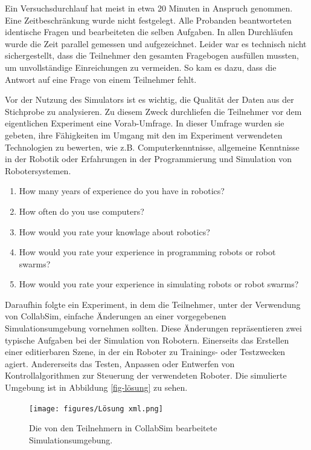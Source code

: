 \documentclass[german,version-2020-11]{uzl-thesis}
\begin{document}
  Ein Versuchsdurchlauf hat meist in etwa 20 Minuten in Anspruch genommen. Eine Zeitbeschränkung wurde nicht festgelegt. 
  Alle Probanden beantworteten identische Fragen und bearbeiteten die selben Aufgaben.
  In allen Durchläufen wurde die Zeit parallel gemessen und aufgezeichnet. Leider war es technisch nicht sichergestellt, 
  dass die Teilnehmer den gesamten Fragebogen ausfüllen mussten, um unvollständige Einreichungen zu vermeiden. 
  So kam es dazu, dass die Antwort auf eine Frage von einem Teilnehmer fehlt.
        
  Vor der Nutzung des Simulators ist es wichtig, die Qualität der Daten aus der Stichprobe zu analysieren. 
  Zu diesem Zweck durchliefen die Teilnehmer vor dem eigentlichen Experiment eine Vorab-Umfrage. 
  In dieser Umfrage wurden sie gebeten, ihre Fähigkeiten im Umgang mit den im Experiment verwendeten Technologien zu bewerten, 
  wie z.B. Computerkenntnisse, allgemeine Kenntnisse in der Robotik oder Erfahrungen in der Programmierung und Simulation von Robotersystemen.

  \begin{enumerate}
    \item 
    How many years of experience do you have in robotics?
    \item
    How often do you use computers? 
    \item
    How would you rate your knowlage about robotics? %
    \item
    How would you rate your experience in programming robots or robot swarms? %
    \item
    How would you rate your experience in simulating robots or robot swarms? %
    \end{enumerate}        
        
  Daraufhin folgte ein Experiment, in dem die Teilnehmer, unter der Verwendung von CollabSim, einfache Änderungen an einer vorgegebenen Simulationsumgebung vornehmen sollten.
  Diese Änderungen repräsentieren zwei typische Aufgaben bei der Simulation von Robotern. 
  Einerseits das Erstellen einer editierbaren Szene, in der ein Roboter zu Trainings- oder Testzwecken agiert.
  Andererseits das Testen, Anpassen oder Entwerfen von Kontrollalgorithmen zur Steuerung der verwendeten Roboter. 
  Die simulierte Umgebung ist in Abbildung \vref{fig-lösung} zu sehen.

  \begin{figure}[htpb]
    \centering
    \texttt{[image: figures/Lösung xml.png]}
    \caption{Die von den Teilnehmern in CollabSim bearbeitete Simulationsumgebung.}
    \label{fig-lösung}
  \end{figure}
\end{document}

